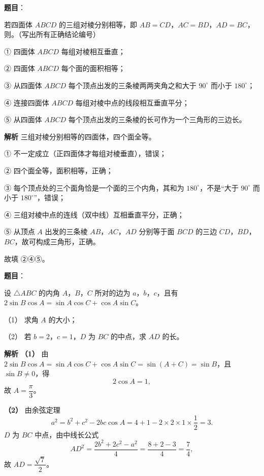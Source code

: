 \begin{answer}

\textbf{题目}：

若四面体 $ABCD$ 的三组对棱分别相等，即 $AB=CD$，$AC=BD$，$AD=BC$，则\gkblank{}。（写出所有正确结论编号）

① 四面体 $ABCD$ 每组对棱相互垂直；

② 四面体 $ABCD$ 每个面的面积相等；

③ 从四面体 $ABCD$ 每个顶点出发的三条棱两两夹角之和大于 $90^\circ$ 而小于 $180^\circ$；

④ 连接四面体 $ABCD$ 每组对棱中点的线段相互垂直平分；

⑤ 从四面体 $ABCD$ 每个顶点出发的三条棱的长可作为一个三角形的三边长。

\textbf{解析}
三组对棱分别相等的四面体，四个面全等。

① 不一定成立（正四面体才每组对棱垂直），错误；

② 四个面全等，面积相等，正确；

③ 每个顶点处的三个面角恰是一个面的三个内角，其和为 $180^\circ$，不是“大于 $90^\circ$ 而小于 $180^\circ$”，错误；

④ 三组对棱中点的连线（双中线）互相垂直平分，正确；

⑤ 从顶点 $A$ 出发的三条棱 $AB$，$AC$，$AD$ 分别等于面 $BCD$ 的三边 $CD$，$BD$，$BC$，故可构成三角形，正确。

故填 ②④⑤。


\end{answer}
\begin{answer}

\textbf{题目}：

设 $\triangle ABC$ 的内角 $A$，$B$，$C$ 所对的边为 $a$，$b$，$c$，且有 $2\sin B\cos A=\sin A\cos C+\cos A\sin C$。

（1） 求角 $A$ 的大小；

（2） 若 $b=2$，$c=1$，$D$ 为 $BC$ 的中点，求 $AD$ 的长。

\textbf{解析}
\textbf{（1）} 由 $2\sin B\cos A=\sin A\cos C+\cos A\sin C=\sin(A+C)=\sin B$，且 $\sin B\neq0$，得
\nopagebreak[4]
\[2\cos A=1,\]
故 $A=\dfrac\pi3$。

\textbf{（2）} 由余弦定理
\nopagebreak[4]
\[a^2=b^2+c^2-2bc\cos A=4+1-2\times2\times1\times\frac12=3.\]
$D$ 为 $BC$ 中点，由中线长公式
\nopagebreak[4]
\[AD^2=\frac{2b^2+2c^2-a^2}4=\frac{8+2-3}4=\frac74,\]
故 $AD=\dfrac{\sqrt7}2$。



\end{answer}
